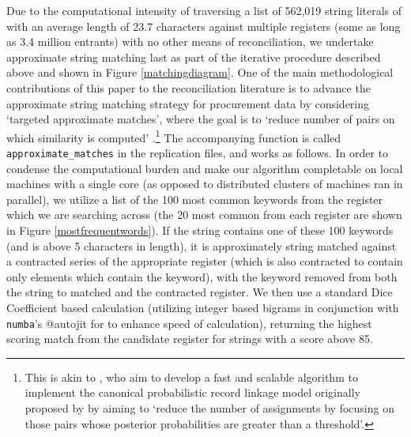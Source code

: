 \documentclass[12pt]{article}
\begin{document}
Due to the computational intensity of traversing a list of 562,019 string literals of with an average length of 23.7 characters against multiple registers (some as long as 3.4 million entrants) with no other means of reconciliation, we undertake approximate string matching last as part of the iterative procedure described above and shown in Figure \ref{matchingdiagram}. One of the main methodological contributions of this paper to the reconciliation literature is to advance the approximate string matching strategy for procurement data by considering `targeted approximate matches', where the goal is to `reduce number of pairs on which similarity is computed' \citep{Koudas:2006:RLS:1142473.1142599}.\footnote{This is akin to \cite{imai2017}, who aim to develop a fast and scalable algorithm to implement  the canonical probabilistic record linkage model originally proposed by \cite{doi:10.1080/01621459.1969.10501049} by aiming to `reduce the number of assignments by focusing on those pairs whose posterior probabilities are greater than a threshold'.} The accompanying function is called \texttt{approximate\_matches} in the replication files, and works as follows. In order to condense the computational burden and make our algorithm completable on local machines with a single core (as opposed to distributed clusters of machines ran in parallel), we utilize a list of the 100 most common keywords from the register which we are searching across (the 20 most common from each register are shown in Figure \ref{mostfrequentwords}). If the string contains one of these 100 keywords (and is above 5 characters in length), it is approximately string matched against a contracted series of the appropriate register (which is also contracted to contain only elements which contain the keyword), with the keyword removed from both the string to matched and the contracted register. We then use a standard Dice Coefficient based calculation (utilizing integer based bigrams in conjunction with \texttt{numba}'s @autojit for to enhance speed of calculation), returning the highest scoring match from the candidate register for strings with a score above 85. 
\end{document}
